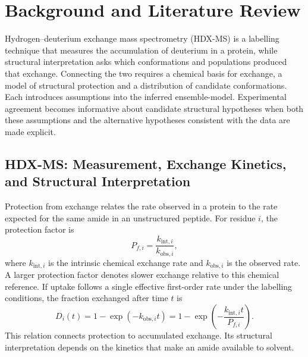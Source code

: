 
\chapter{Background and Literature Review}
\label{ch:background}

Hydrogen--deuterium exchange mass spectrometry (HDX-MS) is a labelling technique that measures the accumulation of deuterium in a protein, while structural interpretation asks which conformations and populations produced that exchange. Connecting the two requires a chemical basis for exchange, a model of structural protection and a distribution of candidate conformations. Each introduces assumptions into the inferred ensemble-model. Experimental agreement becomes informative about candidate structural hypotheses when both these assumptions and the alternative hypotheses consistent with the data are made explicit.\supercite{bradshawInterpretationHDXData2020,bonomiPrinciplesProteinStructural2017}

\section{HDX-MS: Measurement, Exchange Kinetics, and Structural Interpretation}
\label{sec:bg-hdx}

Protection from exchange relates the rate observed in a protein to the rate expected for the same amide in an unstructured peptide. For residue $i$, the protection factor is
\begin{equation}
    P_{f,i}=\frac{k_{\text{int},i}}{k_{\text{obs},i}},
    \label{eq:bg-protection-factor}
\end{equation}
where $k_{\text{int},i}$ is the intrinsic chemical exchange rate and $k_{\text{obs},i}$ is the observed rate. A larger protection factor denotes slower exchange relative to this chemical reference.\supercite{skinnerProteinHydrogenExchange2012} If uptake follows a single effective first-order rate under the labelling conditions, the fraction exchanged after time $t$ is
\begin{equation}
    D_i(t)=1-\exp\!\left(-k_{\text{obs},i}t\right)
          =1-\exp\!\left(-\frac{k_{\text{int},i}t}{P_{f,i}}\right).
    \label{eq:bg-residue-uptake}
\end{equation}
This relation connects protection to accumulated exchange. Its structural interpretation depends on the kinetics that make an amide available to solvent.\supercite{bradshawInterpretationHDXData2020}

